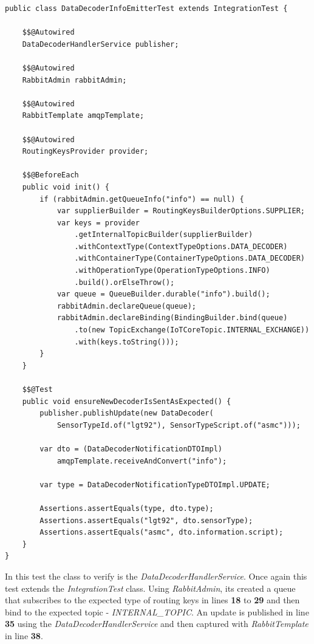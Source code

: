 \begin{lstlisting}[style=Java, caption=Functional Test - Message Broker Interaction - \textbf{Data Decoder Master Backend}, label={code:implementation:tests:func4}]
public class DataDecoderInfoEmitterTest extends IntegrationTest {

    $$@Autowired
    DataDecoderHandlerService publisher;

    $$@Autowired
    RabbitAdmin rabbitAdmin;

    $$@Autowired
    RabbitTemplate amqpTemplate;

    $$@Autowired
    RoutingKeysProvider provider;

    $$@BeforeEach
    public void init() {
        if (rabbitAdmin.getQueueInfo("info") == null) {
            var supplierBuilder = RoutingKeysBuilderOptions.SUPPLIER;
            var keys = provider
                .getInternalTopicBuilder(supplierBuilder)
                .withContextType(ContextTypeOptions.DATA_DECODER)
                .withContainerType(ContainerTypeOptions.DATA_DECODER)
                .withOperationType(OperationTypeOptions.INFO)
                .build().orElseThrow();
            var queue = QueueBuilder.durable("info").build();
            rabbitAdmin.declareQueue(queue);
            rabbitAdmin.declareBinding(BindingBuilder.bind(queue)
                .to(new TopicExchange(IoTCoreTopic.INTERNAL_EXCHANGE))
                .with(keys.toString()));
        }
    }

    $$@Test
    public void ensureNewDecoderIsSentAsExpected() {
        publisher.publishUpdate(new DataDecoder(
            SensorTypeId.of("lgt92"), SensorTypeScript.of("asmc")));

        var dto = (DataDecoderNotificationDTOImpl) 
            amqpTemplate.receiveAndConvert("info");
        
        var type = DataDecoderNotificationTypeDTOImpl.UPDATE;

        Assertions.assertEquals(type, dto.type);
        Assertions.assertEquals("lgt92", dto.sensorType);
        Assertions.assertEquals("asmc", dto.information.script);
    }
}
\end{lstlisting}

In this test the class to verify is the \textit{DataDecoderHandlerService}. Once again this test extends the \textit{IntegrationTest} class. Using \textit{RabbitAdmin}, its created a queue that subscribes to the expected type of routing keys in lines \textbf{18} to \textbf{29} and then bind to the expected topic - \textit{INTERNAL\_TOPIC}.
An update is published in line \textbf{35} using the \textit{DataDecoderHandlerService} and then captured with \textit{RabbitTemplate} in line \textbf{38}.

